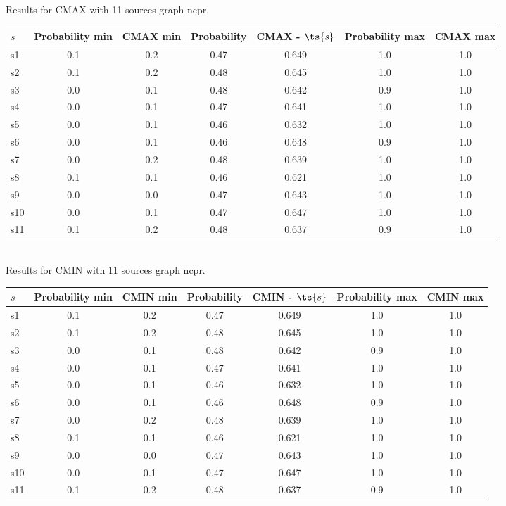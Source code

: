 \documentclass{article}
\begin{document}
\noindent Results for CMAX with 11 sources graph ncpr.

\noindent\begin{tabular}{|l|c|c|c|c|c|c|}
\hline
$s$& Probability min & CMAX min & Probability & CMAX - $\ts{s}$ & Probability max & CMAX max\\
\hline
s1 &0.1 & 0.2 & 0.47 & 0.649 & 1.0 & 1.0\\
\hline
s2 &0.1 & 0.2 & 0.48 & 0.645 & 1.0 & 1.0\\
\hline
s3 &0.0 & 0.1 & 0.48 & 0.642 & 0.9 & 1.0\\
\hline
s4 &0.0 & 0.1 & 0.47 & 0.641 & 1.0 & 1.0\\
\hline
s5 &0.0 & 0.1 & 0.46 & 0.632 & 1.0 & 1.0\\
\hline
s6 &0.0 & 0.1 & 0.46 & 0.648 & 0.9 & 1.0\\
\hline
s7 &0.0 & 0.2 & 0.48 & 0.639 & 1.0 & 1.0\\
\hline
s8 &0.1 & 0.1 & 0.46 & 0.621 & 1.0 & 1.0\\
\hline
s9 &0.0 & 0.0 & 0.47 & 0.643 & 1.0 & 1.0\\
\hline
s10 &0.0 & 0.1 & 0.47 & 0.647 & 1.0 & 1.0\\
\hline
s11 &0.1 & 0.2 & 0.48 & 0.637 & 0.9 & 1.0\\
\hline
\end{tabular}\\

\noindent Results for CMIN with 11 sources graph ncpr.

\noindent\begin{tabular}{|l|c|c|c|c|c|c|}
\hline
$s$& Probability min & CMIN min & Probability & CMIN - $\ts{s}$ & Probability max & CMIN max\\
\hline
s1 &0.1 & 0.2 & 0.47 & 0.649 & 1.0 & 1.0\\
\hline
s2 &0.1 & 0.2 & 0.48 & 0.645 & 1.0 & 1.0\\
\hline
s3 &0.0 & 0.1 & 0.48 & 0.642 & 0.9 & 1.0\\
\hline
s4 &0.0 & 0.1 & 0.47 & 0.641 & 1.0 & 1.0\\
\hline
s5 &0.0 & 0.1 & 0.46 & 0.632 & 1.0 & 1.0\\
\hline
s6 &0.0 & 0.1 & 0.46 & 0.648 & 0.9 & 1.0\\
\hline
s7 &0.0 & 0.2 & 0.48 & 0.639 & 1.0 & 1.0\\
\hline
s8 &0.1 & 0.1 & 0.46 & 0.621 & 1.0 & 1.0\\
\hline
s9 &0.0 & 0.0 & 0.47 & 0.643 & 1.0 & 1.0\\
\hline
s10 &0.0 & 0.1 & 0.47 & 0.647 & 1.0 & 1.0\\
\hline
s11 &0.1 & 0.2 & 0.48 & 0.637 & 0.9 & 1.0\\
\hline
\end{tabular}\\
\end{document}
